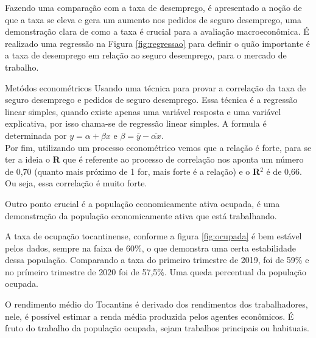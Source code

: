 \par Fazendo uma comparação com a taxa de desemprego, é apresentado a noção de que a taxa se eleva e gera um aumento nos pedidos de seguro desemprego, uma demonstração clara de como a taxa é crucial para a avaliação macroeconômica. É realizado uma regressão na Figura \ref{fig:regressao} para definir o quão importante é a taxa de desemprego em relação ao seguro desemprego, para o mercado de trabalho.

\begin{smbox}[label={labelbox},nameref={Desigualdade por gênero}]{Metódos econométricos}
	Usando uma técnica para provar a correlação da taxa de seguro desemprego e pedidos de seguro desemprego. Essa técnica é a regressão linear simples, quando existe apenas uma variável resposta e uma variável explicativa, por isso chama-se de regressão linear simples. A formula é determinada por $y = \alpha + \beta x$ e $\beta = \overline{y} - \overline{\alpha x}$.
	\\
	Por fim, utilizando um processo econométrico vemos que a relação é forte, para se ter a ideia o \textbf{R} que é referente ao processo de correlação nos aponta um número de 0,70 (quanto mais próximo de 1 for, mais forte é a relação) e o \textbf{R}$^{2}$ é de 0,66. Ou seja, essa correlação é muito forte.
\end{smbox}



\par Outro ponto crucial é a população economicamente ativa ocupada, é uma demonstração da população economicamente ativa que está trabalhando.



\par  A taxa de ocupação tocantinense, conforme a figura \ref{fig:ocupada} é bem estável pelos dados, sempre na faixa de 60\%, o que demonstra uma certa estabilidade dessa população. Comparando a taxa do primeiro trimestre de 2019, foi de 59\% e no prímeiro trimestre de 2020 foi de 57,5\%. Uma queda percentual da população ocupada.



\par O rendimento médio do Tocantins é derivado dos rendimentos dos trabalhadores, nele, é possível estimar a renda média produzida pelos agentes econômicos. É fruto do trabalho da população ocupada, sejam trabalhos principais ou habituais.

